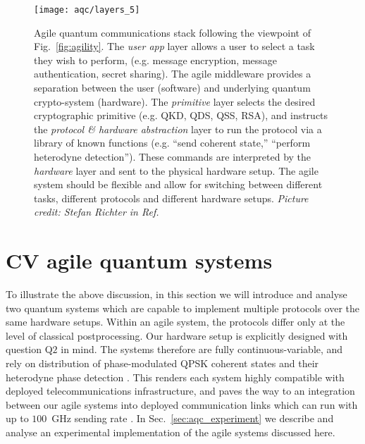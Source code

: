 \begin{figure}[htp]
\centering
{\texttt{[image: aqc/layers\_5]}}
\caption{\label{fig:big_agile} Agile quantum communications stack following the viewpoint of Fig.~\ref{fig:agility}. The \emph{user app} layer allows a user to select a task they wish to perform, (e.g. message encryption, message authentication, secret sharing). The agile middleware provides a separation between the user (software) and underlying quantum crypto-system (hardware). The \emph{primitive} layer selects the desired cryptographic primitive (e.g. QKD, QDS, QSS, RSA), and instructs the \emph{protocol \& hardware abstraction} layer to run the protocol via a library of known functions (e.g. ``send coherent state,'' ``perform heterodyne detection''). These commands are interpreted by the \emph{hardware} layer and sent to the physical hardware setup. The agile system should be flexible and allow for switching between different tasks, different protocols and different hardware setups. \emph{Picture credit: Stefan Richter in Ref.~\cite{Richter2020}}}
\end{figure}



\clearpage
\section{CV agile quantum systems}

To illustrate the above discussion, in this section we will introduce and analyse two quantum systems which are capable to implement multiple protocols over the same hardware setups. Within an agile system, the protocols differ only at the level of classical postprocessing. Our hardware setup is explicitly designed with question Q$2$ in mind. The systems therefore are fully continuous-variable, and rely on distribution of phase-modulated QPSK coherent states and their heterodyne phase detection \cite{Agrawal2008}. This renders each system highly compatible with deployed telecommunications infrastructure, and paves the way to an integration between our agile systems into deployed communication links which can run with up to $100$~GHz sending rate \cite{Khan2015, Khan2016}. In Sec.~\ref{sec:aqc_experiment} we describe and analyse an experimental implementation of the agile systems discussed here.

